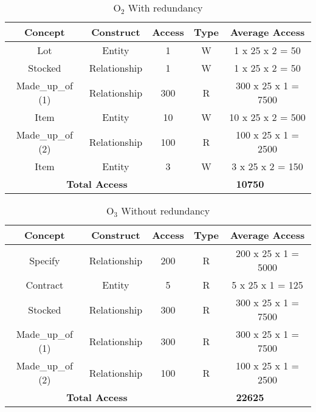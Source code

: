 \newpage
\begin{table}[!h]\caption{	$ \textrm{O}_\textrm{2} $ With redundancy}
	\begin{center}
		\begin{tabular}{| c | c | c | c | c |}
			\hline
			\textbf{Concept} & \textbf{Construct} & \textbf{Access} & \textbf{Type} & \textbf{Average Access} \\ \hline
			Lot & Entity & 1 & W & 1 x 25 x 2 = 50 \\ \hline
			Stocked & Relationship & 1 & W & 1 x 25 x 2 = 50 \\ \hline
			Made\_up\_of (1) & Relationship & 300 & R & 300 x 25 x 1 = 7500 \\ \hline
			Item & Entity & 10 & W & 10 x 25 x 2 = 500 \\ \hline
			Made\_up\_of (2) & Relationship & 100 & R & 100 x 25 x 1 = 2500 \\ \hline
			Item & Entity & 3 & W & 3 x 25 x 2 = 150 \\ \hline
			\multicolumn{3}{|c|}{\textbf{Total Access}} & \multicolumn{2}{|c|}{\textbf{10750}} \\ \hline
		\end{tabular}
	\end{center}
\end{table}
\begin{table}[!h]\caption{	$ \textrm{O}_\textrm{3} $ Without redundancy }
	\begin{center}
		\begin{tabular}{| c | c | c | c | c |}
			\hline
			\textbf{Concept} & \textbf{Construct} & \textbf{Access} & \textbf{Type} & \textbf{Average Access} \\ \hline
			Specify & Relationship & 200 & R & 200 x 25 x 1 = 5000 \\ \hline
			Contract & Entity & 5 & R & 5 x 25 x 1 = 125 \\ \hline
			Stocked & Relationship & 300 & R & 300 x 25 x 1 = 7500 \\ \hline
            Made\_up\_of (1) & Relationship & 300 & R & 300 x 25 x 1 = 7500 \\ \hline
            Made\_up\_of (2) & Relationship & 100 & R & 100 x 25 x 1 = 2500 \\ \hline
			\multicolumn{3}{|c|}{\textbf{Total Access}} & \multicolumn{2}{|c|}{\textbf{22625}} \\ \hline
		\end{tabular}
	\end{center}
\end{table}
